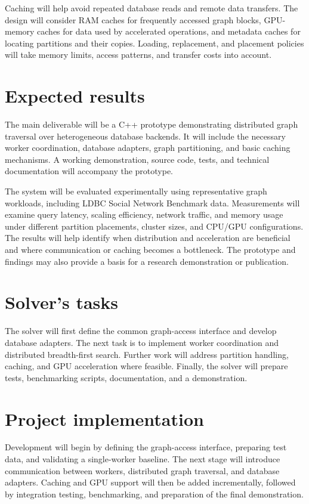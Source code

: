 \documentclass[a4paper]{article}
\begin{document}
Caching will help avoid repeated database reads and remote data transfers. The design will consider RAM caches for frequently accessed graph blocks, GPU-memory caches for data used by accelerated operations, and metadata caches for locating partitions and their copies. Loading, replacement, and placement policies will take memory limits, access patterns, and transfer costs into account.

\section{Expected results}

The main deliverable will be a C++ prototype demonstrating distributed graph traversal over heterogeneous database backends. It will include the necessary worker coordination, database adapters, graph partitioning, and basic caching mechanisms. A working demonstration, source code, tests, and technical documentation will accompany the prototype.

The system will be evaluated experimentally using representative graph workloads, including LDBC Social Network Benchmark data. Measurements will examine query latency, scaling efficiency, network traffic, and memory usage under different partition placements, cluster sizes, and CPU/GPU configurations. The results will help identify when distribution and acceleration are beneficial and where communication or caching becomes a bottleneck. The prototype and findings may also provide a basis for a research demonstration or publication.

\section{Solver's tasks}

The solver will first define the common graph-access interface and develop database adapters. The next task is to implement worker coordination and distributed breadth-first search. Further work will address partition handling, caching, and GPU acceleration where feasible. Finally, the solver will prepare tests, benchmarking scripts, documentation, and a demonstration.

\section{Project implementation}

Development will begin by defining the graph-access interface, preparing test data, and validating a single-worker baseline. The next stage will introduce communication between workers, distributed graph traversal, and database adapters. Caching and GPU support will then be added incrementally, followed by integration testing, benchmarking, and preparation of the final demonstration.
\end{document}
